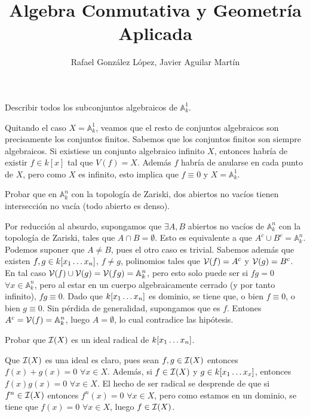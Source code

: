 \documentclass[twoside]{article}
\begin{document}
\title{Algebra Conmutativa y Geometría Aplicada}
\author{Rafael González López, Javier Aguilar Martín}
\maketitle

\begin{ejercicio}{1}
Describir todos los subconjuntos algebraicos de $\mathbb{A}_k^1$.
\begin{solucion}
Quitando el caso $X=\mathbb{A}_k^1$, veamos que el resto de conjuntos algebraicos son precisamente los conjuntos finitos. Sabemos que los conjuntos finitos son siempre algebraicos. Si existiese un conjunto algebraico infinito $X$, entonces habría de existir $f \in k[x]$ tal que $V(f)=X$. Además $f$ habría de anularse en cada punto de $X$, pero como $X$ es infinito, esto implica que $f\equiv 0$ y $X=\mathbb{A}_k^1$.
\end{solucion}
\end{ejercicio}

\newpage 
\begin{ejercicio}{2}
Probar que en $\mathbb{A}^n_k$ con la topología de Zariski, dos abiertos no vacíos tienen intersección no vacía (todo abierto es denso).
\begin{solucion}
Por reducción al absurdo, supongamos que $\exists A,B$ abiertos no vacíos de $\mathbb{A}_k^n$ con la topología de Zariski, tales que $A\cap B =\emptyset$. Esto es equivalente a que $A^c \cup B^c = \mathbb{A}_k^n$. Podemos suponer que $A\neq B$, pues el otro caso es trivial. Sabemos además que existen $f,g\in k[x_1\dotsc x_{n}]$, $f\neq g$, polinomios tales que $\mathcal{V}(f) = A^c$ y $\mathcal{V}(g)=B^c$. En tal caso $\mathcal{V}(f)\cup \mathcal{V}(g)=\mathcal{V}(fg) = \mathbb{A}^n_k$, pero esto solo puede ser si $fg = 0$ $\forall x\in \mathbb{A}^n_k$, pero al estar en un cuerpo algebraicamente cerrado (y por tanto infinito), $fg\equiv 0$. Dado que $k[x_1\dotsc x_{n}]$ es dominio, se tiene que, o bien $f\equiv 0$, o bien $g \equiv 0$. Sin pérdida de generalidad, supongamos que es $f$. Entones $A^c = \mathcal{V}(f) = \mathbb{A}_k^n$, luego $A=\emptyset$, lo cual contradice las hipótesis.
\end{solucion}
\end{ejercicio}

\newpage 
\begin{ejercicio}{3}
Probar que $\mathcal{I}(X)$ es un ideal radical de $k[x_1\dotsc x_{n}]$.
\begin{solucion}
Que $\mathcal{I}(X)$ es una ideal es claro, pues sean $f,g \in \mathcal{I}(X)$ entonces $f(x)+g(x)=0$ $\forall x\in X$. Además, si $f\in \mathcal{I}(X)$ y $g \in k[x_1\dotsc x_{x}]$, entonces $f(x)g(x)=0$ $\forall x\in X$. El hecho de ser radical se desprende de que si $f^n\in \mathcal{I}(X)$ entonces $f^n(x) =0$ $\forall x \in X$, pero como estamos en un dominio, se tiene que $f(x)=0$ $\forall x\in X$, luego $f\in \mathcal{I}(X)$.
\end{solucion}
\end{ejercicio}	
\end{document}
